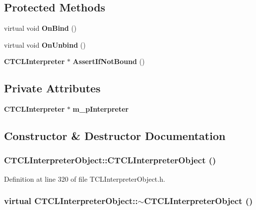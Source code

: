 \subsection*{Protected Methods}
\begin{CompactItemize}
\item 
virtual void {\bf On\-Bind} ()
\item 
virtual void {\bf On\-Unbind} ()
\item 
{\bf CTCLInterpreter} $\ast$ {\bf Assert\-If\-Not\-Bound} ()
\end{CompactItemize}
\subsection*{Private Attributes}
\begin{CompactItemize}
\item 
{\bf CTCLInterpreter} $\ast$ {\bf m\_\-p\-Interpreter}
\end{CompactItemize}


\subsection{Constructor \& Destructor Documentation}
\subsubsection{\setlength{\rightskip}{0pt plus 5cm}CTCLInterpreter\-Object::CTCLInterpreter\-Object ()\hspace{0.3cm}{\tt  [inline]}}\label{classCTCLInterpreterObject_a0}




Definition at line 320 of file TCLInterpreter\-Object.h.
\subsubsection{\setlength{\rightskip}{0pt plus 5cm}virtual CTCLInterpreter\-Object::$\sim$CTCLInterpreter\-Object ()\hspace{0.3cm}{\tt  [inline, virtual]}}\label{classCTCLInterpreterObject_a1}





